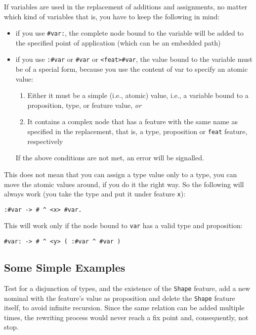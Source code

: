 \documentclass[11pt,a4paper]{article}
\newcommand{\cd}[1]{\texttt{#1}}
\begin{document}
{If variables are used in the replacement of additions and assignments, no
matter which kind of variables that is, you have to keep the following in mind:

\begin{itemize}
\item if you use \texttt{\#var:}, the complete node bound to the variable will
  be added to the specified point of application (which can be an embedded
  path)
\item if you use \texttt{:\#var} or \texttt{\#var} or \texttt{<feat>\#var}, the
  value bound to the variable must be of a special form, because you use the
  content of var to specify an atomic value:
  \begin{enumerate}
  \item Either it must be a simple (i.e., atomic) value, i.e., a variable bound
    to a proposition, type, or feature value, \emph{or}
  \item It contains a complex node that has a feature with the same name as
    specified in the replacement, that is, a type, proposition or \texttt{feat}
    feature, respectively
  \end{enumerate}
  If the above conditions are not met, an error will be signalled.
\end{itemize}

This does not mean that you can assign a type value only to a type, you can
move the atomic values around, if you do it the right way.  So the following
will always work (you take the type and put it under feature \texttt{x}):
\begin{verbatim}
:#var -> # ^ <x> #var.
\end{verbatim}

This will work only if the node bound to \texttt{var} has a valid type and
proposition:
\begin{verbatim}
#var: -> # ^ <y> ( :#var ^ #var )
\end{verbatim}

\subsection{Some Simple Examples}

Test for a disjunction of types, and the existence of the \cd{Shape} feature,
add a new nominal with the feature's value as proposition and delete the
\cd{Shape} feature itself, to avoid infinite recursion. Since the same
relation can be added multiple times, the rewriting process would never reach
a fix point and, consequently, not stop.

}
\end{document}
